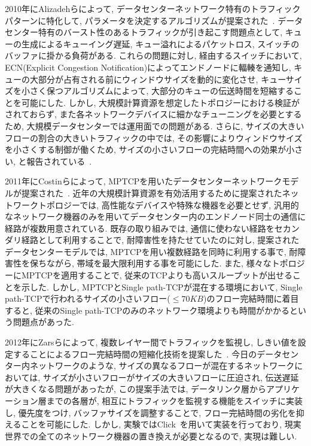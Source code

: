 \documentclass[11pt, a4paper, twocolumn]{jsarticle}
\begin{document}
2010年にAlizadehらによって, データセンターネットワーク特有のトラフィックパターンに特化して,
パラメータを決定するアルゴリズムが提案された~\cite{dctcp}.
データセンター特有のバースト性のあるトラフィックが引き起こす問題点として, キューの生成によるキューイング遅延, キュー溢れによるパケットロス,
スイッチのバッファに掛かる負荷がある.
これらの問題に対し, 経由するスイッチにおいて, ECN(Explicit Congestion Notification)によってエンドノードに輻輳を通知し,
キューの大部分が占有される前にウィンドウサイズを動的に変化させ, キューサイズを小さく保つアルゴリズムによって,
大部分のキューの伝送時間を短縮することを可能にした.
しかし, 大規模計算資源を想定したトポロジーにおける検証がされておらず, また各ネットワークデバイスに細かなチューニングを必要とするため,
大規模データセンターでは運用面での問題がある.
さらに, サイズの大きいフローの割合の大きいトラフィックの中では, その影響によりウィンドウサイズを小さくする制御が働くため,
サイズの小さいフローの完結時間への効果が小さい, と報告されている~\cite{p_fab}.

2011年にCostinらによって, MPTCPを用いたデータセンターネットワークモデルが提案された~\cite{improving}.
近年の大規模計算資源を有効活用するために提案されたネットワークトポロジーでは,
高性能なデバイスや特殊な機器を必要とせず, 汎用的なネットワーク機器のみを用いてデータセンター内のエンドノード同士の通信に経路が複数用意されている.
既存の取り組みでは, 通信に使わない経路をセカンダリ経路として利用することで, 耐障害性を持たせていたのに対し, 提案されたデータセンターモデルでは,
MPTCPを用い複数経路を同時に利用する事で, 耐障害性を保ちながら, 帯域を最大限利用する事を可能にした.
また, 様々なトポロジーにMPTCPを適用することで, 従来のTCPよりも高いスループットが出せることを示した.
しかし, MPTCPとSingle path-TCPが混在する環境において, Single
path-TCPで行われるサイズの小さいフロー($\leq70KB$)のフロー完結時間に着目すると, 従来のSingle
path-TCPのみのネットワーク環境よりも時間がかかるという問題点があった.

2012年にZarsらによって, 複数レイヤー間でトラフィックを監視し,
しきい値を設定することによるフロー完結時間の短縮化技術を提案した~\cite{detail}.
今日のデータセンター内ネットワークのような, サイズの異なるフローが混在するネットワークにおいては, サイズが小さいフローがサイズの大きいフローに圧迫され,
伝送遅延が大きくなる問題があったが, この提案手法では, データリンク層からアプリケーション層までの各層が,
相互にトラフィックを監視する機能をスイッチに実装し, 優先度をつけ, バッファサイズを調整することで, フロー完結時間の劣化を抑えることを可能にした.
しかし, 実験ではClick~\cite{click}を用いて実装を行っており, 現実世界での全てのネットワーク機器の置き換えが必要となるので, 実現は難しい.
\end{document}

